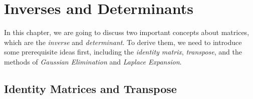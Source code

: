 \chapter{Inverses and Determinants}

In this chapter, we are going to discuss two important concepts about matrices, which are the \textit{inverse} and \textit{determinant}. To derive them, we need to introduce some prerequisite ideas first, including the \textit{identity matrix}, \textit{transpose}, and the methods of \textit{Gaussian Elimination} and \textit{Laplace Expansion}.

\section{Identity Matrices and Transpose}

